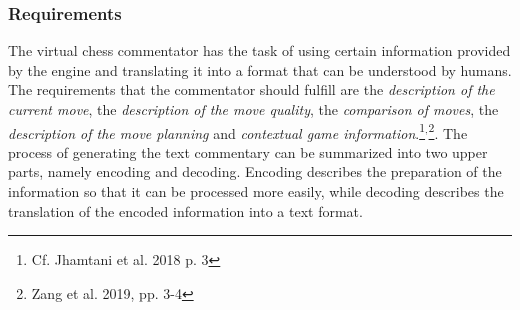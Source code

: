 \subsubsection{Requirements}

The virtual chess commentator has the task of using certain information provided by the engine and translating it into a format that can be understood by humans. The requirements that the commentator should fulfill are the \textit{description of the current move}, the \textit{description of the move quality}, the \textit{comparison of moves}, the \textit{description of the move planning} and \textit{contextual game information}.\footnote{Cf. Jhamtani et al. 2018 p. 3}$^{,}$\footnote{Zang et al. 2019, pp. 3-4}. The process of generating the text commentary can be summarized into two upper parts, namely encoding and decoding. Encoding describes the preparation of the information so that it can be processed more easily, while decoding describes the translation of the encoded information into a text format.